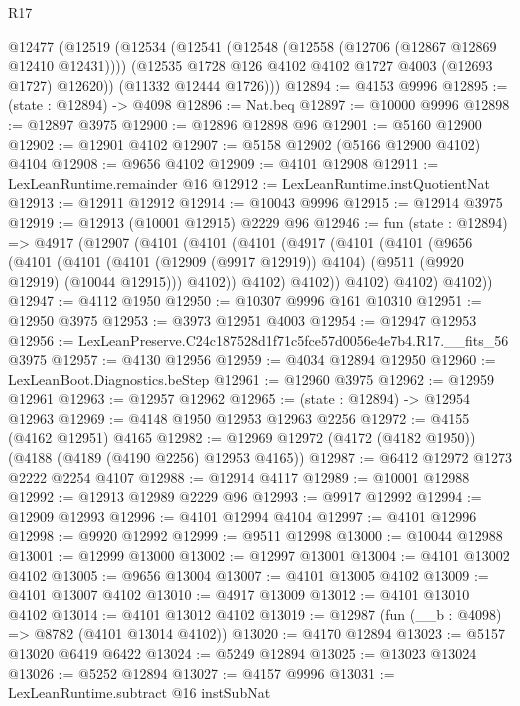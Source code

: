 \begin{lexlean}{R17}
\begin{coremodule}
  @12477
    (@12519
      (@12534
        (@12541
          (@12548 (@12558 (@12706 (@12867 @12869 @12410 @12431))))
          (@12535 @1728 @126 @4102 @4102 @1727 @4003 (@12693 @1727) @12620))
        (@11332 @12444 @1726)))
@12894 := @4153 @9996
@12895 := (state : @12894) -> @4098
@12896 := Nat.beq
@12897 := @10000 @9996
@12898 := @12897 @3975
@12900 := @12896 @12898 @96
@12901 := @5160 @12900
@12902 := @12901 @4102
@12907 := @5158 @12902 (@5166 @12900 @4102) @4104
@12908 := @9656 @4102
@12909 := @4101 @12908
@12911 := LexLeanRuntime.remainder @16
@12912 := LexLeanRuntime.instQuotientNat
@12913 := @12911 @12912
@12914 := @10043 @9996
@12915 := @12914 @3975
@12919 := @12913 (@10001 @12915) @2229 @96
@12946 := fun (state : @12894) =>
  @4917
    (@12907
      (@4101
        (@4101
          (@4101
            (@4917
              (@4101
                (@4101
                  (@9656
                    (@4101
                      (@4101
                        (@4101 (@12909 (@9917 @12919)) @4104)
                        (@9511 (@9920 @12919) (@10044 @12915)))
                      @4102))
                  @4102)
                @4102))
            @4102)
          @4102)
        @4102))
@12947 := @4112 @1950
@12950 := @10307 @9996 @161 @10310
@12951 := @12950 @3975
@12953 := @3973 @12951 @4003
@12954 := @12947 @12953
@12956 := LexLeanPreserve.C24c187528d1f71c5fce57d0056e4e7b4.R17.__fits_56 @3975
@12957 := @4130 @12956
@12959 := @4034 @12894 @12950
@12960 := LexLeanBoot.Diagnostics.beStep
@12961 := @12960 @3975
@12962 := @12959 @12961
@12963 := @12957 @12962
@12965 := (state : @12894) -> @12954 @12963
@12969 := @4148 @1950 @12953 @12963 @2256
@12972 := @4155 (@4162 @12951) @4165
@12982 := @12969 @12972 (@4172 (@4182 @1950)) (@4188 (@4189 (@4190 @2256) @12953 @4165))
@12987 := @6412 @12972 @1273 @2222 @2254 @4107
@12988 := @12914 @4117
@12989 := @10001 @12988
@12992 := @12913 @12989 @2229 @96
@12993 := @9917 @12992
@12994 := @12909 @12993
@12996 := @4101 @12994 @4104
@12997 := @4101 @12996
@12998 := @9920 @12992
@12999 := @9511 @12998
@13000 := @10044 @12988
@13001 := @12999 @13000
@13002 := @12997 @13001
@13004 := @4101 @13002 @4102
@13005 := @9656 @13004
@13007 := @4101 @13005 @4102
@13009 := @4101 @13007 @4102
@13010 := @4917 @13009
@13012 := @4101 @13010 @4102
@13014 := @4101 @13012 @4102
@13019 := @12987 (fun (__b : @4098) => @8782 (@4101 @13014 @4102))
@13020 := @4170 @12894
@13023 := @5157 @13020 @6419 @6422
@13024 := @5249 @12894
@13025 := @13023 @13024
@13026 := @5252 @12894
@13027 := @4157 @9996
@13031 := LexLeanRuntime.subtract @16 instSubNat

\end{coremodule}
\end{lexlean}
